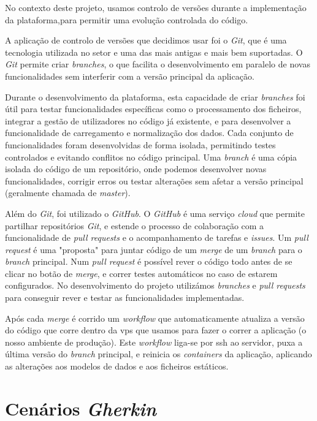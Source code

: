 No contexto deste projeto, usamos controlo de versões durante a implementação da plataforma,para permitir uma evolução controlada do código.

A aplicação de controlo de versões que decidimos usar foi o \textit{Git}, que é uma tecnologia utilizada no setor e uma das mais antigas e mais bem suportadas. O \textit{Git} permite criar \textit{branches}, o que facilita o desenvolvimento em paralelo de novas funcionalidades sem interferir com a versão principal da aplicação.

Durante o desenvolvimento da plataforma, esta capacidade de criar \textit{branches} foi útil para testar funcionalidades específicas como o processamento dos ficheiros, integrar a gestão de utilizadores no código já existente, e para desenvolver a funcionalidade de carregamento e normalização dos dados. Cada conjunto de funcionalidades foram desenvolvidas de forma isolada, permitindo testes controlados e evitando conflitos no código principal. Uma \textit{branch} é uma cópia isolada do código de um repositório, onde podemos desenvolver novas funcionalidades, corrigir erros ou testar alterações sem afetar a versão principal (geralmente chamada de \textit{master}).

Além do \textit{Git}, foi utilizado o \textit{GitHub}. O \textit{GitHub} é uma serviço \textit{cloud} que permite partilhar repositórios \textit{Git}, e estende o processo de colaboração com a funcionalidade de \textit{pull requests} e o acompanhamento de tarefas e \textit{issues}. Um \textit{pull request} é uma "proposta" para juntar código de um \textit{merge} de um \textit{branch} para o \textit{branch} principal. Num \textit{pull request} é possível rever o código todo antes de se clicar no botão de \textit{merge}, e correr testes automáticos no caso de estarem configurados. No desenvolvimento do projeto utilizámos \textit{branches} e \textit{pull requests} para conseguir rever e testar as funcionalidades implementadas. 

Após cada \textit{merge} é corrido um \textit{workflow} que automaticamente atualiza a versão do código que corre dentro da \gls{vps} que usamos para fazer o correr a aplicação (o nosso ambiente de produção). Este \textit{workflow} liga-se por \gls{ssh} ao servidor, puxa a última versão do \textit{branch} principal, e reinicia os \textit{containers} da aplicação, aplicando as alterações aos modelos de dados e aos ficheiros estáticos.

\chapter{Cenários \textit{Gherkin}}
\label{ch:cenariosGherkin}

